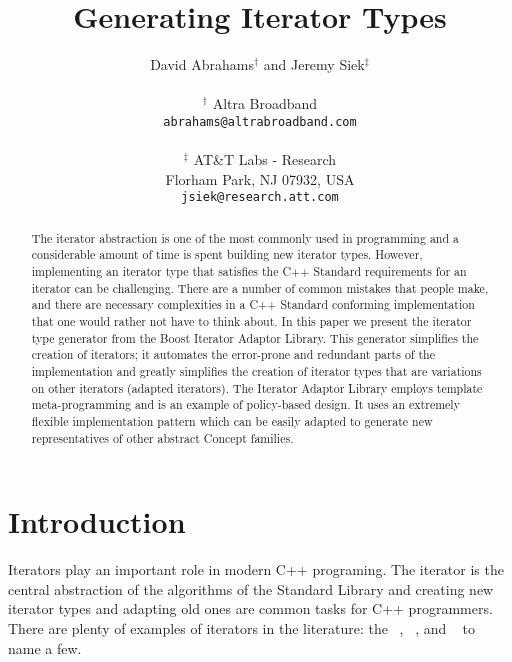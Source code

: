 \documentclass{netobjectdays}
\begin{document}
\title{Generating Iterator Types}

\author{David Abrahams$^\dag$ and Jeremy Siek$^\ddag$ \\
\\
$^\dag$ Altra Broadband \\
\texttt{abrahams@altrabroadband.com}\\
\\
$^\ddag$ AT\&T Labs - Research \\
Florham Park, NJ 07932, USA \\
\texttt{jsiek@research.att.com}
}

\maketitle

\begin{abstract}
The iterator abstraction is one of the most commonly used in
programming and a considerable amount of time is spent building new
iterator types. However, implementing an iterator type that satisfies
the C++ Standard requirements for an iterator can be
challenging. There are a number of common mistakes that people make,
and there are necessary complexities in a C++ Standard conforming
implementation that one would rather not have to think about. In this
paper we present the iterator type generator from the Boost Iterator
Adaptor Library. This generator simplifies the creation of iterators;
it automates the error-prone and redundant parts of the implementation
and greatly simplifies the creation of iterator types that are
variations on other iterators (adapted iterators). The Iterator
Adaptor Library employs template meta-programming and is an example of
policy-based design. It uses an extremely flexible implementation
pattern which can be easily adapted to generate new representatives of
other abstract Concept families.

\end{abstract}


\section{Introduction}


Iterators play an important role in modern C++ programing. The
iterator is the central abstraction of the algorithms of the Standard
Library and creating new iterator types and adapting old ones are
common tasks for C++ programmers. There are plenty of examples of
iterators in the literature: the
~\cite{austern99:_gener_progr_stl},
~\cite{koenig97:_rumin_cpp},
 and
~\cite{iso98:_cpp_final_draft_standard}
to name a few.
\end{document}
